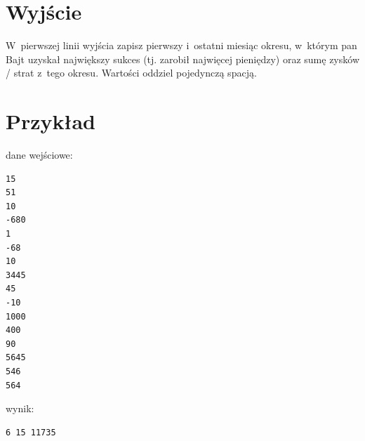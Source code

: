 \documentclass{article}
\begin{document}
\section*{Wyjście}

W~pierwszej linii wyjścia zapisz pierwszy i~ostatni miesiąc okresu, w~którym pan Bajt uzyskał największy sukces (tj.
zarobił najwięcej pieniędzy) oraz sumę zysków / strat z~tego okresu. Wartości oddziel pojedynczą spacją.

\section*{Przykład}
\begin{multicols*}{2}
dane wejściowe:
\begin{verbatim}
15
51
10
-680
1
-68
10
3445
45
-10
1000
400
90
5645
546
564
\end{verbatim}
wynik:
\begin{verbatim}
6 15 11735
\end{verbatim}
\end{multicols*}
\end{document}
